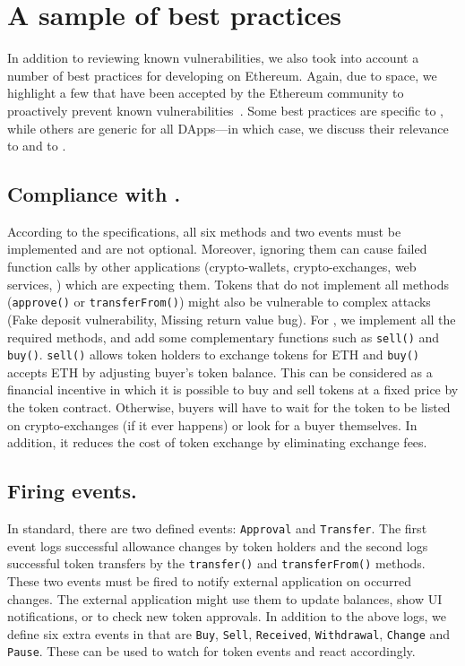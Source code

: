 
\section{A sample of best practices}\label{section:bp}

In addition to reviewing known vulnerabilities, we also took into account a number of best practices for developing \erc on Ethereum. Again, due to space, we highlight a few that have been accepted by the Ethereum community to proactively prevent known vulnerabilities~\cite{TokenBP}. Some best practices are specific to \erc, while others are generic for all DApps---in which case, we discuss their relevance to \erc and to \sys.

\subsection{Compliance with \erc.}

According to the \erc specifications, all six methods and two events must be implemented and are not optional. Moreover, ignoring them can cause failed function calls by other applications (\ie crypto-wallets, crypto-exchanges, web services, \etc) which are expecting them. Tokens that do not implement all methods (\eg \texttt{approve()} or \texttt{transferFrom()}) might also be vulnerable to complex attacks (\eg Fake deposit vulnerability\cite{DEPOSafe}, Missing return value bug\cite{ErcBug}). For \sys, we implement all the required methods, and add some complementary functions such as \texttt{sell()} and \texttt{buy()}. \texttt{sell()} allows token holders to exchange tokens for ETH and \texttt{buy()} accepts ETH by adjusting buyer's token balance. {\blue This can be considered as a financial incentive in which it is possible to buy and sell tokens at a fixed price by the token contract. Otherwise, buyers will have to wait for the token to be listed on crypto-exchanges (if it ever happens) or look for a buyer themselves. In addition, it reduces the cost of token exchange by eliminating exchange fees.}

\subsection{Firing events.}

In \erc standard, there are two defined events: \texttt{Approval} and \texttt{Transfer}. The first event logs successful allowance changes by token holders and the second logs successful token transfers by the \texttt{transfer()} and \texttt{transferFrom()} methods. These two events must be fired to notify external application on occurred changes. The external application might use them to update balances, show UI notifications, or to check new token approvals. In addition to the above logs, we define six extra events in \sys that are \texttt{Buy}, \texttt{Sell}, \texttt{Received}, \texttt{Withdrawal}, \texttt{Change} and \texttt{Pause}. These can be used to watch for token events and react accordingly.


